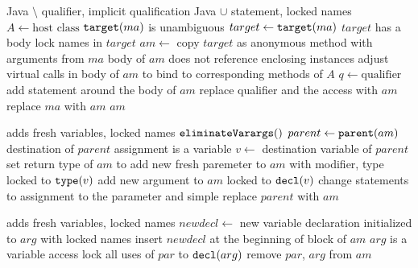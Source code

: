 \begin{algorithm}[p]
\caption{$\refactoring{Inline To Anonymous Method}(am \colon \type{MethodAccess}) : \type{AnonymousMethod}$}
\label{alg:InlineToAnonymousMethod}
\begin{algorithmic}[1]
\REQUIRE Java $\setminus$  qualifier, implicit  qualification
\ENSURE Java $\cup$  statement, locked names
\medskip
  \STATE $A \leftarrow \text{host class}$
  \STATE \assert $\text{\texttt{target}}(ma)$ is unambiguous
  \STATE $target \leftarrow \text{\texttt{target}}(ma)$
  \STATE \assert $target$ has a body
  \STATE lock names in $target$
  \STATE $am \leftarrow$ copy $target$ as anonymous method with arguments from $ma$
    \STATE \assert body of $am$ does not reference enclosing instances
    \STATE adjust virtual calls in body of $am$ to bind to corresponding methods of $A$
    \STATE $q \leftarrow \text{qualifier}$
    \STATE add  statement around the body of $am$
    \STATE replace qualifier and the access with $am$
  \ELSE
    \STATE replace $ma$ with $am$
  \ENDIF
  \RETURN $am$
\end{algorithmic}
\end{algorithm}

\begin{algorithm}[p]
\caption{$\refactoring{Introduce Out Parameter}(am \colon \type{AnonymousMethod})$}
\label{alg:IntroduceOutParameter}
\begin{algorithmic}[1]
\REQUIRE
\ENSURE adds fresh variables, locked names
\medskip
  \STATE $\text{\texttt{eliminateVarargs}}()$
  \STATE $parent \leftarrow \text{\texttt{parent}}(am)$
    \STATE \assert destination of $parent$ assignment is a variable
    \STATE $v \leftarrow $ destination variable of $parent$
    \STATE set return type of $am$ to 
    \STATE add new fresh paremeter to $am$ with  modifier, type locked to $\text{\texttt{type}}(v)$
    \STATE add new argument to $am$ locked to $\text{\texttt{decl}}(v)$
    \STATE change  statements to assignment to the parameter and simple 
    \STATE replace $parent$ with $am$
  \ENDIF
\end{algorithmic}
\end{algorithm}


\begin{algorithm}[p]
\caption{$\refactoring{Open Variables}(am \colon \type{AnonymousMethod})$}
\label{alg:OpenVariables}
\begin{algorithmic}[1]
\REQUIRE 
\ENSURE adds fresh variables, locked names 
\medskip
      \STATE $newdecl \leftarrow$ new variable declaration initialized to $arg$ with locked names
      \STATE insert $newdecl$ at the beginning of block of $am$
      \STATE \assert $arg$ is a variable access
      \STATE lock all uses of $par$ to $\text{\texttt{decl}}(arg)$
    \ENDIF
    \STATE remove $par$, $arg$ from $am$
  \ENDFOR
\end{algorithmic}
\end{algorithm}


